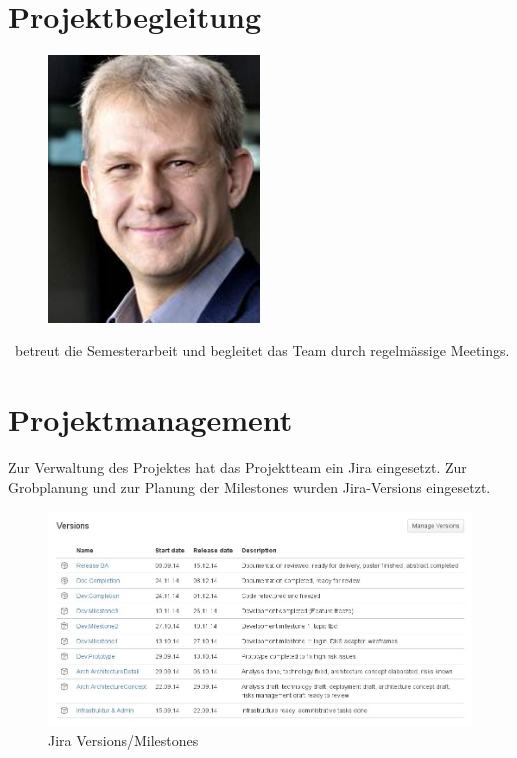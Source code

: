 	\section{Projektbegleitung}
	\begin{figure}[H]
		\begin{minipage}[b]{0.5\linewidth}
			\includegraphics[width=0.5\textwidth]{projectPlan/media/img/ozimmermann.jpg}
			\centering
			\caption{\teacher}
			\label{fig:olafzimmermann}
		\end{minipage}
	\end{figure}
	\teacher\ betreut die Semesterarbeit und begleitet das Team durch regelmässige Meetings.


	\section{Projektmanagement}
		Zur Verwaltung des Projektes hat das Projektteam ein Jira eingesetzt.
		Zur Grobplanung und zur Planung der Milestones wurden Jira-Versions eingesetzt.
		
		\begin{figure}[H]
			\includegraphics[width=\textwidth]{projectPlan/media/img/jiraVersions.jpg}
			\centering
			\caption{Jira Versions/Milestones}
			\label{fig:jiraVersions}
		\end{figure}
		
